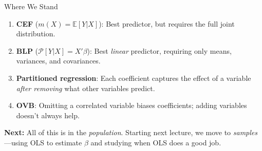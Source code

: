 \documentclass[aspectratio=169, handout, t]{beamer}
\numberwithin{equation}{section}
\begin{document}
\begin{frame}{Where We Stand}
\small
\begin{tcolorbox}[colback=blue!5, colframe=blue!50, title=Recap: From Population to Practice]
\begin{enumerate}
\item \textbf{CEF} ($m(X)=\mathbb{E}[Y|X]$): Best predictor, but requires the full joint distribution.
\item \textbf{BLP} ($\mathcal{P}[Y|X]=X'\beta$): Best \emph{linear} predictor, requiring only means, variances, and covariances.
\item \textbf{Partitioned regression}: Each coefficient captures the effect of a variable \emph{after removing} what other variables predict.
\item \textbf{OVB}: Omitting a correlated variable biases coefficients; adding variables doesn't always help.
\end{enumerate}
\end{tcolorbox}
\medskip
\textbf{Next:} All of this is in the \emph{population}. Starting next lecture, we move to \emph{samples}---using OLS to estimate $\beta$ and studying when OLS does a good job.
\end{frame}
\end{document}
